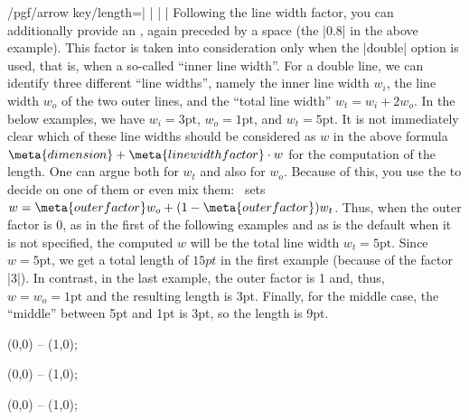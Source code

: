 \begin{key}{/pgf/arrow key/length=| |%
    | |}
  Following the line width factor, you can additionally provide an
  , again preceded by a space (the |0.8| in the
  above example). This factor is
  taken into consideration only when the |double| option is used, that
  is, when a so-called ``inner line width''. For a double line, we can
  identify three different ``line widths'', namely the inner line
  width $w_i$, the line width  $w_o$ of the two outer lines, and the
  ``total line width'' $w_t = w_i + 2w_o$. In the below examples, we
  have $w_i = 3\mathrm{pt}$, $w_o=1\mathrm{pt}$, and $w_t =
  5\mathrm{pt}$. It is not immediately clear 
  which of these line widths should be considered as $w$ in the above
  formula $\meta{dimension} + \meta{line width factor}\cdot w$ for the
  computation of the length. One can argue both for $w_t$ and also for
  $w_o$. Because of this, you use the  to
  decide on one of them or even 
  mix them: \tikzname\ sets $w = \meta{outer factor} w_o +
  (1-\meta{outer factor})w_t$. Thus, when the outer factor is $0$, as
  in the first of the following examples and as is the default when it
  is not specified, the computed $w$ will be the total
  line width $w_t = 5\mathrm{pt}$. Since
  $w=5\mathrm{pt}$, we get a total length of $15pt$ in the first
  example (because of the factor |3|). In contrast, in the last
  example, the outer factor is 1 and, thus, $w = w_o = \mathrm{1pt}$ and the
  resulting length is 3pt. Finally, for the middle case, the ``middle'' between 5pt and
  1pt is 3pt, so the length is 9pt.
\begin{codeexample}[]
\tikz \draw [line width=1pt, double distance=3pt,
             arrows = {-Latex[length=0pt 3 0]}] (0,0) -- (1,0);
\end{codeexample}
\begin{codeexample}[]
\tikz \draw [line width=1pt, double distance=3pt,
             arrows = {-Latex[length=0pt 3 .5]}] (0,0) -- (1,0);
\end{codeexample}
\begin{codeexample}[]
\tikz \draw [line width=1pt, double distance=3pt,
             arrows = {-Latex[length=0pt 3 1]} ] (0,0) -- (1,0);
\end{codeexample}


\end{key}
